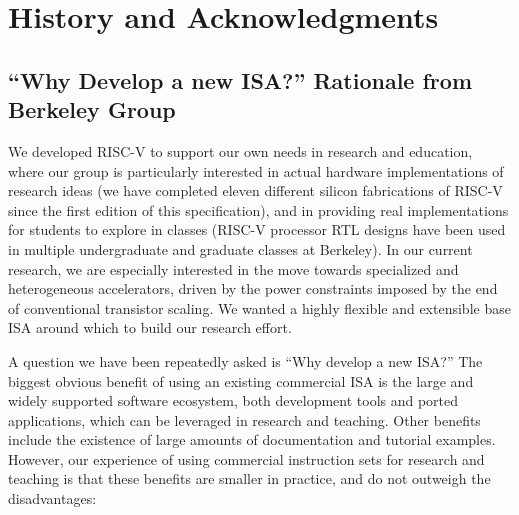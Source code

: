 \chapter{History and Acknowledgments}
\label{history}

\section{``Why Develop a new ISA?'' Rationale from Berkeley Group}

We developed RISC-V to support our own needs in research and
education, where our group is particularly interested in actual
hardware implementations of research ideas (we have completed eleven
different silicon fabrications of RISC-V since the first edition of
this specification), and in providing real implementations for
students to explore in classes (RISC-V processor RTL designs have been
used in multiple undergraduate and graduate classes at Berkeley).  In
our current research, we are especially interested in the move towards
specialized and heterogeneous accelerators, driven by the power
constraints imposed by the end of conventional transistor scaling.  We
wanted a highly flexible and extensible base ISA around which to build
our research effort.

A question we have been repeatedly asked is ``Why develop a new ISA?''
The biggest obvious benefit of using an existing commercial ISA is the
large and widely supported software ecosystem, both development tools
and ported applications, which can be leveraged in research and
teaching.  Other benefits include the existence of large amounts of
documentation and tutorial examples.  However, our experience of using
commercial instruction sets for research and teaching is that these
benefits are smaller in practice, and do not outweigh the
disadvantages:

